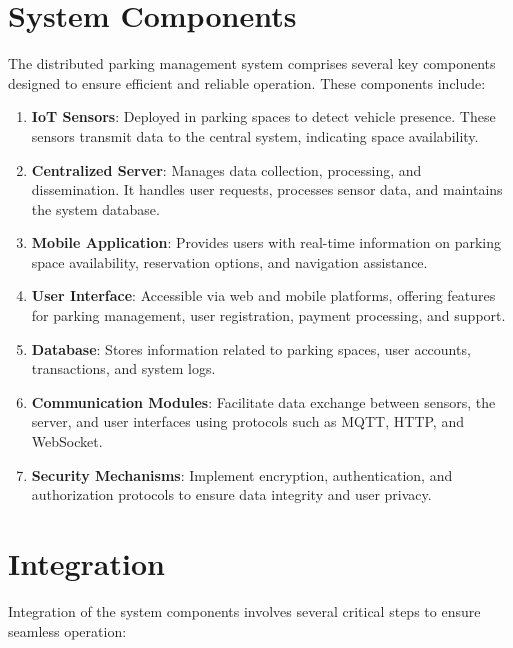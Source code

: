 \documentclass[oneside, 12pt, a4paper, draft]{book}
\begin{document}
\section{System Components}
\label{sec:org781fe7b}
The distributed parking management system comprises several key components designed to ensure efficient and reliable operation. These components include:

\begin{enumerate}
\item \textbf{\textbf{IoT Sensors}}: Deployed in parking spaces to detect vehicle presence. These sensors transmit data to the central system, indicating space availability.
\item \textbf{\textbf{Centralized Server}}: Manages data collection, processing, and dissemination. It handles user requests, processes sensor data, and maintains the system database.
\item \textbf{\textbf{Mobile Application}}: Provides users with real-time information on parking space availability, reservation options, and navigation assistance.
\item \textbf{\textbf{User Interface}}: Accessible via web and mobile platforms, offering features for parking management, user registration, payment processing, and support.
\item \textbf{\textbf{Database}}: Stores information related to parking spaces, user accounts, transactions, and system logs.
\item \textbf{\textbf{Communication Modules}}: Facilitate data exchange between sensors, the server, and user interfaces using protocols such as MQTT, HTTP, and WebSocket.
\item \textbf{\textbf{Security Mechanisms}}: Implement encryption, authentication, and authorization protocols to ensure data integrity and user privacy.
\end{enumerate}
\section{Integration}
\label{sec:orga350ec4}
Integration of the system components involves several critical steps to ensure seamless operation:
\end{document}
